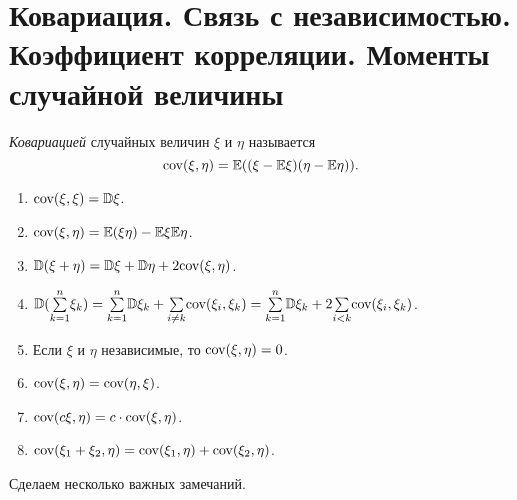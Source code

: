 \section{Ковариация. Связь с независимостью. Коэффициент корреляции. Моменты случайной величины}

\begin{definition}
    \textit{Ковариацией} случайных величин $\xi$ и $\eta$ называется
     $$\text{cov}(\xi, \eta) = \mathbb{E} ((\xi - \mathbb{E} \xi)(\eta - \mathbb{E} \eta)).$$
 \end{definition}

 \begin{properties}[ковариации]
\enewline
     \begin{enumerate}

         \item $\text{cov}(\xi, \xi) = \mathbb{D} \xi$.


         \item $\text{cov}(\xi, \eta) = \mathbb{E} (\xi\eta) - \mathbb{E} \xi \mathbb{E} \eta$.


         \item $\mathbb{D} (\xi + \eta) = \mathbb{D} \xi + \mathbb{D} \eta + 2\text{cov}(\xi, \eta)$.

         \item $\mathbb{D} (\overset{n}{\underset{k = 1}{\sum}}\xi_k) = \overset{n}{\underset{k = 1}{\sum}}\mathbb{D} \xi_k + \underset{i\neq k}{\sum}\text{cov}(\xi_i, \xi_k) =
                   \overset{n}{\underset{k = 1}{\sum}}\mathbb{D} \xi_k + 2\underset{i < k}{\sum}\text{cov}(\xi_i, \xi_k)$.

         \item Если $\xi$ и $\eta$ независимые, то $\text{cov}(\xi, \eta) = 0$.

         \item $\text{cov}(\xi, \eta) = \text{cov}(\eta, \xi)$.


         \item $\text{cov}(c\xi, \eta) = c\cdot \text{cov}(\xi, \eta)$.


         \item $\text{cov}(\xi_1+\xi_2, \eta) = \text{cov}(\xi_1, \eta) + \text{cov}(\xi_2, \eta)$.
     \end{enumerate}
 \end{properties}

Сделаем несколько важных замечаний.

